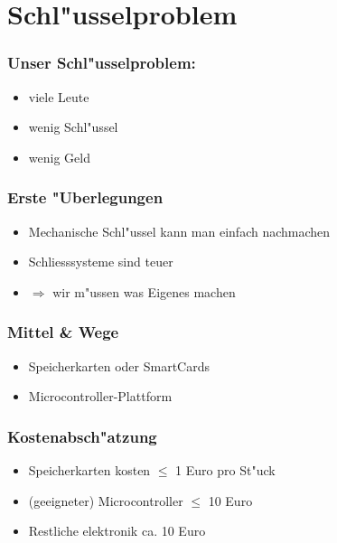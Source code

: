 \section{Schl"usselproblem}
\begin{frame}
	\frametitle{Unser Schl"usselproblem:}
	\begin{itemize}
		\item viele Leute
		\item wenig Schl"ussel
		\item wenig Geld
	\end{itemize}
\end{frame}

\begin{frame}
	\frametitle{Erste "Uberlegungen}
	\begin{itemize}
		\item Mechanische Schl"ussel kann man einfach nachmachen
		\item Schliesssysteme sind teuer
		\item $\Rightarrow$ wir m"ussen was Eigenes machen
	\end{itemize}
\end{frame}

\begin{frame}
	\frametitle{Mittel \& Wege}
	\begin{itemize}
		\item Speicherkarten oder SmartCards
		\item Microcontroller-Plattform
	\end{itemize}
\end{frame}

\begin{frame}
	\frametitle{Kostenabsch"atzung}
	\begin{itemize}
		\item Speicherkarten kosten $\le$ 1 Euro pro St"uck
		\item (geeigneter) Microcontroller $\le$ 10 Euro
		\item Restliche elektronik ca. 10 Euro
	\end{itemize}
\end{frame}

